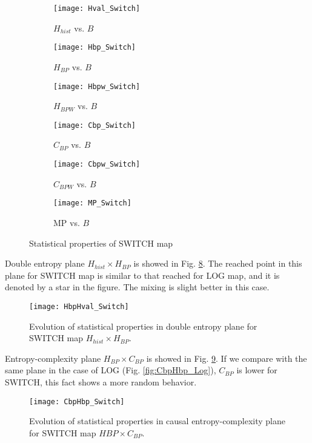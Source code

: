 \begin{figure}[htpb]
	\centering
	\begin{subfigure}[b]{0.49\textwidth}
		\texttt{[image: Hval\_Switch]}
		\caption{$H_{hist}$ vs. $B$}
		\label{fig:Hval_Switch}
	\end{subfigure}
	\begin{subfigure}[b]{0.49\textwidth}
		\texttt{[image: Hbp\_Switch]}
		\caption{$H_{BP}$ vs. $B$}
		\label{fig:Hbp_Switch}
	\end{subfigure}
	\begin{subfigure}[b]{0.49\textwidth}
		\texttt{[image: Hbpw\_Switch]}
		\caption{$H_{BPW}$ vs. $B$}
		\label{fig:Hbpw_Switch}
	\end{subfigure}
	\begin{subfigure}[b]{0.49\textwidth}
		\texttt{[image: Cbp\_Switch]}
		\caption{$C_{BP}$ vs. $B$}
		\label{fig:Cbp_Switch}
	\end{subfigure}
	\begin{subfigure}[b]{0.49\textwidth}
		\texttt{[image: Cbpw\_Switch]}
		\caption{$C_{BPW}$ vs. $B$}
		\label{fig:Cbpw_Switch}
	\end{subfigure}
	\begin{subfigure}[b]{0.49\textwidth}
		\texttt{[image: MP\_Switch]}
		\caption{MP vs. $B$}
		\label{fig:MP_Switch}
	\end{subfigure}
	\caption{Statistical properties of SWITCH map}
	\label{fig:SWITCH_QuantiB}
\end{figure}

Double entropy plane $H_{hist} \times H_{BP}$ is showed in Fig. \ref{fig:SWITCH_HH}.
The reached point in this plane for SWITCH map is similar to that reached for LOG map, and it is denoted by a star in the figure.
The mixing is slight better in this case.

\begin{figure}[htpb]
	\centering
	\texttt{[image: HbpHval\_Switch]}
	\caption{Evolution of statistical properties in double entropy plane for SWITCH map $H_{hist} \times H_{BP}$.}
	\label{fig:SWITCH_HH}
\end{figure}

Entropy-complexity plane $H_{BP} \times C_{BP}$ is showed in Fig. \ref{fig:SWITCH_HC}.
If we compare with the same plane in the case of LOG (Fig. \ref{fig:CbpHbp_Log}), $C_{BP}$ is lower for SWITCH, this fact shows a more random behavior.

\begin{figure}[htpb]
	\centering
	\texttt{[image: CbpHbp\_Switch]}
	\caption{Evolution of statistical properties in causal entropy-complexity plane for SWITCH map $H{BP} \times C_{BP}$.}
	\label{fig:SWITCH_HC}
\end{figure}